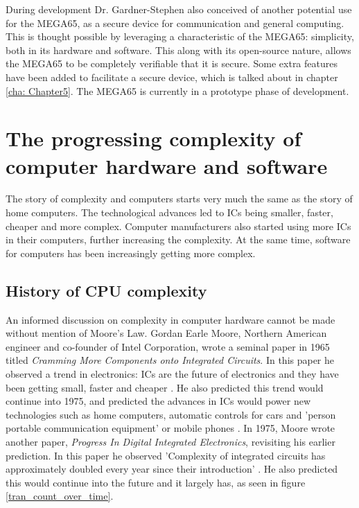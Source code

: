 During development Dr. Gardner-Stephen also conceived of another potential use for the MEGA65, as a secure device for communication and general computing. This is thought possible by leveraging a characteristic of the MEGA65: simplicity, both in its hardware and software. This along with its open-source nature, allows the MEGA65 to be completely verifiable that it is secure. Some extra features have been added to facilitate a secure device, which is talked about in chapter \ref{cha: Chapter5}. The MEGA65 is currently in a prototype phase of development.

\section{The progressing complexity of computer hardware and software}
\label{The progressing complexity of computer hardware and software}
The story of complexity and computers starts very much the same as the story of home computers. The technological advances led to ICs being smaller, faster, cheaper and more complex. Computer manufacturers also started using more ICs in their computers, further increasing the complexity. At the same time, software for computers has been increasingly getting more complex. 

\subsection{History of CPU complexity}
An informed discussion on complexity in computer hardware cannot be made without mention of Moore's Law. Gordan Earle Moore, Northern American engineer and co-founder of Intel Corporation, wrote a seminal paper in 1965 titled \textit{Cramming More Components onto Integrated Circuits}. In this paper he observed a trend in electronics: ICs are the future of electronics and they have been getting small, faster and cheaper
\cite{RN33}. He also predicted this trend would continue into 1975, and predicted the advances in ICs would power new technologies such as home computers, automatic controls for cars and 'person portable communication equipment' or mobile phones 
\cite{RN33}. In 1975, Moore wrote another paper, \textit{Progress In Digital Integrated Electronics}, revisiting his earlier prediction. In this paper he observed 'Complexity of integrated circuits has approximately doubled every year since their introduction' 
\cite{RN52}. He also predicted this would continue into the future and it largely has, as seen in figure \ref{tran_count_over_time}. 

